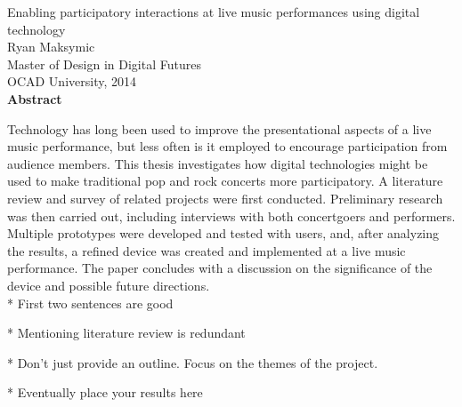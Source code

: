 \begin{center}
{Enabling participatory interactions at live music performances using digital technology\\[0.25cm]
Ryan Maksymic\\[0.25cm]
Master of Design in Digital Futures\\[0.25cm]
OCAD University, 2014\\[0.75cm]
\large\textbf{Abstract}}\\
\end{center}

Technology has long been used to improve the presentational aspects of a live music performance, but less often is it employed to encourage participation from audience members. This thesis investigates how digital technologies might be used to make traditional pop and rock concerts more participatory. A literature review and survey of related projects were first conducted. Preliminary research was then carried out, including interviews with both concertgoers and performers. Multiple prototypes were developed and tested with users, and, after analyzing the results, a refined device was created and implemented at a live music performance. The paper concludes with a discussion on the significance of the device and possible future directions.\\

* First two sentences are good

* Mentioning literature review is redundant

* Don't just provide an outline. Focus on the themes of the project.

* Eventually place your results here
